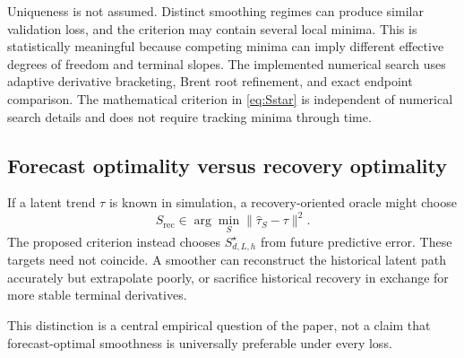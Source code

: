 Uniqueness is not assumed. Distinct smoothing regimes can produce similar validation loss, and the criterion may contain several local minima. This is statistically meaningful because competing minima can imply different effective degrees of freedom and terminal slopes. The implemented numerical search uses adaptive derivative bracketing, Brent root refinement, and exact endpoint comparison. The mathematical criterion in \cref{eq:Sstar} is independent of numerical search details and does not require tracking minima through time.

\subsection{Forecast optimality versus recovery optimality}

If a latent trend $\tau$ is known in simulation, a recovery-oriented oracle might choose
\begin{equation}
\label{eq:latent_recovery_oracle}
S_{\mathrm{rec}}
\in
\arg\min_S
\|\widehat\tau_S-\tau\|^2.
\end{equation}
The proposed criterion instead chooses $S^\star_{d,L,h}$ from future predictive error. These targets need not coincide. A smoother can reconstruct the historical latent path accurately but extrapolate poorly, or sacrifice historical recovery in exchange for more stable terminal derivatives.

This distinction is a central empirical question of the paper, not a claim that forecast-optimal smoothness is universally preferable under every loss.
